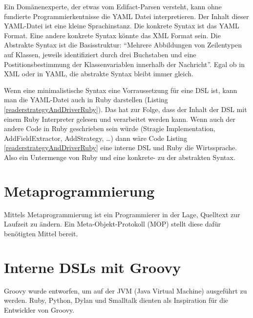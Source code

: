 \documentclass[11pt,english,ngerman, headsepline]{scrreprt}
\begin{document}


Ein Domänenexperte, der etwas vom Edifact-Parsen versteht, kann ohne fundierte
Programmierkentnisse die YAML Datei interpretieren.
Der Inhalt dieser YAML-Datei ist eine kleine Sprachinstanz. Die
konkrete Syntax ist das YAML Format. Eine andere konkrete Syntax könnte
das XML Format sein. Die Abstrakte Syntax ist die Basisstruktur: ``Mehrere
Abbildungen von Zeilentypen auf Klassen, jeweils identifiziert durch drei
Buchstaben und eine Postitionsbestimmung der Klassenvariablen innerhalb der
Nachricht''.
Egal ob in XML oder in YAML, die abstrakte Syntax bleibt immer gleich.

Wenn eine minimalistische Syntax eine Vorraussetzung für eine DSL ist, kann man
die YAML-Datei auch in Ruby darstellen (Listing
\ref{readerstrategyAndDriverRuby}). Das hat zur Folge, dass der Inhalt der DSL
mit einem Ruby Interpreter gelesen und verarbeitet werden kann. Wenn auch der
andere Code in Ruby geschrieben sein würde (Stragie Implementation,
AddFieldExtractor, AddStrategy, \ldots) dann wäre Code Listing
\ref{readerstrategyAndDriverRuby} eine interne DSL und Ruby die Wirtssprache.
Also ein Untermenge von Ruby und eine konkrete- zu der abstrakten Syntax.







\section{Metaprogrammierung}\label{metaprogrammingLabel}

Mittels Metaprogrammierung ist ein Programmierer in der Lage, Quelltext zur
Laufzeit zu ändern. Ein Meta-Objekt-Protokoll (MOP) stellt diese dafür
benötigten Mittel bereit.



\section{Interne DSLs mit Groovy}

Groovy wurde entworfen, um auf der JVM (Java Virtual Machine)
ausgeführt zu werden. Ruby, Python, Dylan und Smalltalk dienten als Inspiration
für die Entwickler von Groovy.
\end{document}
